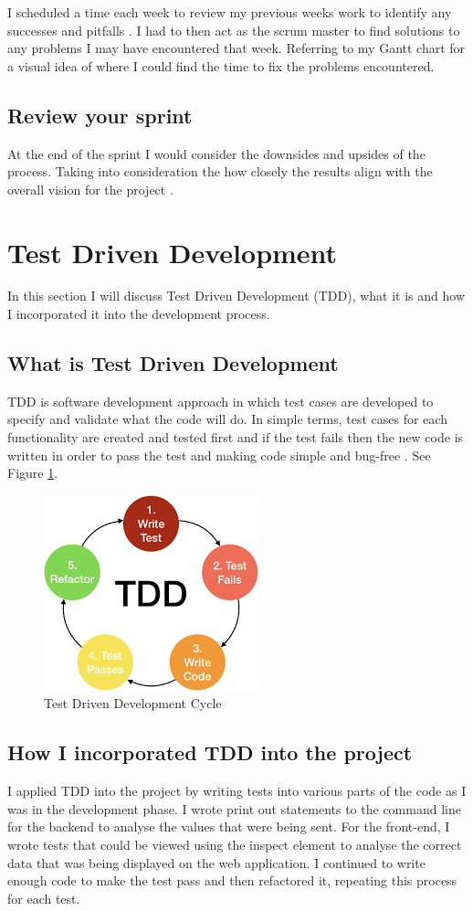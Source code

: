 I scheduled a time each week to review my previous weeks work to identify any successes and pitfalls \cite{Scrum}. I had to then act as the scrum master to find solutions to any problems I may have encountered that week. Referring to my Gantt chart for a visual idea of where I could find the time to fix the problems encountered.

\subsection{Review your sprint}
At the end of the sprint I would consider the downsides and upsides of the process. Taking into consideration the how closely the results align with the overall vision for the project \cite{Scrum}. 

\section{Test Driven Development}
In this section I will discuss Test Driven Development (TDD), what it is and how I incorporated it into the development process.

\subsection{What is Test Driven Development}
TDD is software development approach in which test cases are developed to specify and validate what the code will do. In simple terms, test cases for each functionality are created and tested first and if the test fails then the new code is written in order to pass the test and making code simple and bug-free \cite{TDD}. See Figure \ref{TDD}.

\begin{figure}[h]
\centering
\includegraphics[scale=0.5]{img/TDD.png}
\caption{Test Driven Development Cycle}
\label{TDD}
\end{figure}

\subsection{How I incorporated TDD into the project}
I applied TDD into the project by writing tests into various parts of the code as I was in the development phase. I wrote print out statements to the command line for the backend to analyse the values that were being sent. For the front-end, I wrote tests that could be viewed using the inspect element to analyse the correct data that was being displayed on the web application. I continued to write enough code to make the test pass and then refactored it, repeating this process for each test. 

